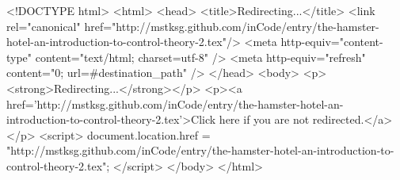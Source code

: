 <!DOCTYPE html>
<html>
<head>
<title>Redirecting...</title>
<link rel="canonical" href="http://mstksg.github.com/inCode/entry/the-hamster-hotel-an-introduction-to-control-theory-2.tex"/>
<meta http-equiv="content-type" content="text/html; charset=utf-8" />
<meta http-equiv="refresh" content="0; url=#{destination_path}" />
</head>
<body>
  <p><strong>Redirecting...</strong></p>
  <p><a href='http://mstksg.github.com/inCode/entry/the-hamster-hotel-an-introduction-to-control-theory-2.tex'>Click here if you are not redirected.</a></p>
  <script>
    document.location.href = "http://mstksg.github.com/inCode/entry/the-hamster-hotel-an-introduction-to-control-theory-2.tex";
  </script>
</body>
</html>
